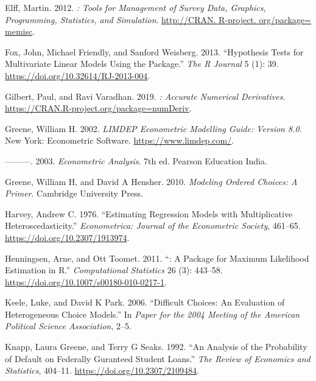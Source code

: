 \begin{CSLReferences}{1}{0}
\leavevmode{}%
Elff, Martin. 2012. \emph{{: Tools for Management of Survey Data, Graphics, Programming, Statistics, and Simulation}}. \href{http://CRAN.\%20R-project.\%20org/package=\%20memisc}{http://CRAN. R-project. org/package= memisc}.

\leavevmode{}%
Fox, John, Michael Friendly, and Sanford Weisberg. 2013. {``{Hypothesis Tests for Multivariate Linear Models Using the  Package.}''} \emph{The R Journal} 5 (1): 39. \url{https://doi.org/10.32614/RJ-2013-004}.

\leavevmode{}%
Gilbert, Paul, and Ravi Varadhan. 2019. \emph{: Accurate Numerical Derivatives}. \url{https://CRAN.R-project.org/package=numDeriv}.

\leavevmode{}%
Greene, William H. 2002. \emph{LIMDEP Econometric Modelling Guide: Version 8.0}. New York: Econometric Software. \url{https://www.limdep.com/}.

\leavevmode{}%
---------. 2003. \emph{Econometric Analysis}. 7th ed. Pearson Education India.

\leavevmode{}%
Greene, William H, and David A Hensher. 2010. \emph{Modeling Ordered Choices: A Primer}. Cambridge University Press.

\leavevmode{}%
Harvey, Andrew C. 1976. {``Estimating Regression Models with Multiplicative Heteroscedasticity.''} \emph{Econometrica: Journal of the Econometric Society}, 461--65. \url{https://doi.org/10.2307/1913974}.

\leavevmode{}%
Henningsen, Arne, and Ott Toomet. 2011. {``{: A Package for Maximum Likelihood Estimation in R}.''} \emph{Computational Statistics} 26 (3): 443--58. \url{https://doi.org/10.1007/s00180-010-0217-1}.

\leavevmode{}%
Keele, Luke, and David K Park. 2006. {``{Difficult Choices: An Evaluation of Heterogeneous Choice Models}.''} In \emph{Paper for the 2004 Meeting of the American Political Science Association}, 2--5.

\leavevmode{}%
Knapp, Laura Greene, and Terry G Seaks. 1992. {``An Analysis of the Probability of Default on Federally Guranteed Student Loans.''} \emph{The Review of Economics and Statistics}, 404--11. \url{https://doi.org/10.2307/2109484}.


\end{CSLReferences}
